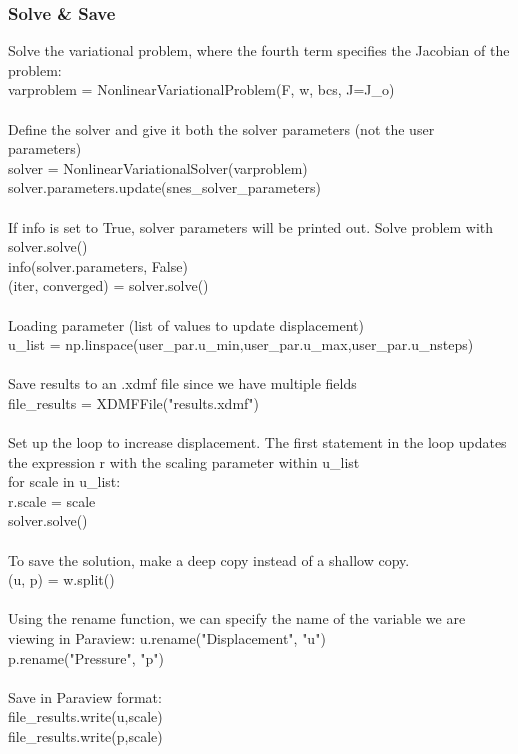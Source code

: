 \documentclass[12pt,3p]{article}
\begin{document}
\subsubsection{Solve \& Save}
Solve the variational problem, where the fourth term specifies the Jacobian of the problem: \\
{\selectfont
varproblem = NonlinearVariationalProblem(F, w, bcs, J=J\_o) \\ \\
} 
Define the solver and give it both the solver parameters (not the user parameters) \\
{\selectfont
solver = NonlinearVariationalSolver(varproblem) \\
solver.parameters.update(snes\_solver\_parameters) \\ \\ 
} 
If info is set to True, solver parameters will be printed out. Solve problem with {\selectfont
solver.solve()} \\
{\selectfont
info(solver.parameters, False) \\ 
(iter, converged) = solver.solve() \\ \\
}
Loading parameter (list of values to update displacement) \\
{\selectfont
u\_list = np.linspace(user\_par.u\_min,user\_par.u\_max,user\_par.u\_nsteps) \\ \\
}
Save results to an .xdmf file since we have multiple fields \\
{\selectfont
file\_results = XDMFFile("results.xdmf") \\ \\
}
Set up the loop to increase displacement. The first statement in the loop updates the expression r with the scaling parameter within u\_list \\
{\selectfont
for scale in u\_list: \\
\indent \indent r.scale = scale \\
\indent \indent solver.solve() \\ \\
} 
To save the solution, make a deep copy instead of a shallow copy. \\
{\selectfont
\indent \indent (u, p) = w.split() \\ \\
} 
Using the rename function, we can specify the name of the variable we are viewing in Paraview:
{\selectfont
\indent \indent u.rename("Displacement", "u") \\
\indent \indent p.rename("Pressure", "p") \\ \\
}
Save in Paraview format: \\
{\selectfont
\indent \indent file\_results.write(u,scale) \\
\indent \indent file\_results.write(p,scale) \\ \\
}
\end{document}
